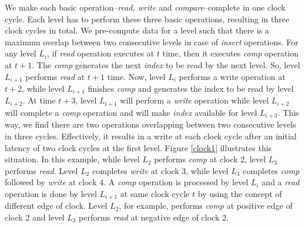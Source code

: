 \documentclass[10pt, conference, compsocconf]{IEEEtran}
\begin{document}
We make each basic operation--{\it read, write} and {\it compare}--complete in one clock cycle.
Each level has to perform these three basic operations, resulting in three clock cycles in total.
We pre-compute data for a level such that there is a maximum overlap between two consecutive levels in case of {\it insert} operations.
For any level $L_i$, if {\it read} operation executes at $t$ time, then it executes {\it comp} operation at $t+1$.
The {\it comp} generates the next {\it index} to be read by the next level.
So, level $L_{i+1}$ performs {\it read} at $t+1$ time.
Now, level $L_i$ performs a write operation at $t+2$, while level $L_{i+1}$ finishes {\it comp} and generates the index to be read by level $L_{i+2}$.
At time $t+3$, level $L_{i+1}$ will perform a {\it write} operation while level $L_{i+2}$ will complete a {\it comp} operation and will make {\it index} available for level $L_{i+3}$.
This way, we find there are two operations overlapping between two consecutive levels in three cycles.
Effectively, it results in a write at each clock cycle after an initial latency of two clock cycles at the first level.
Figure \ref{clock1} illustrates this situation.
In this example, while level $L_2$ performs {\it comp} at clock 2, level $L_3$ performs {\it read}.
Level $L_2$ completes {\it write} at clock 3, while level $L_3$ completes {\it comp} followed by {\it write} at clock 4.
A {\it comp} operation is processed by level $L_i$ and a {\it read} operation is done by level $L_{i+1}$ at same clock cycle $t$ by using the concept of different edge of clock.
Level $L_2$, for example, performs {\it comp} at positive edge of clock 2 and level $L_3$ performs {\it read} at negative edge of clock 2.
\end{document}
